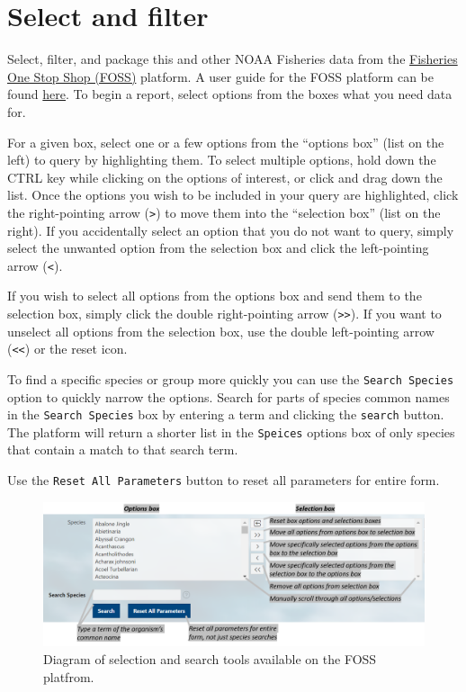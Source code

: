 \documentclass[
  letterpaper,
  oneside,
  open=any]{scrbook}
\begin{document}
\hypertarget{select-and-filter}{%
\section{Select and filter}\label{select-and-filter}}

Select, filter, and package this and other NOAA Fisheries data from the
\href{https://www.fisheries.noaa.gov/foss}{Fisheries One Stop Shop
(FOSS)} platform. A user guide for the FOSS platform can be found
\href{https://www.fisheries.noaa.gov/foss/f?p=215:7:7542600605674:::::}{here}.
To begin a report, select options from the boxes what you need data for.

For a given box, select one or a few options from the ``options box''
(list on the left) to query by highlighting them. To select multiple
options, hold down the CTRL key while clicking on the options of
interest, or click and drag down the list. Once the options you wish to
be included in your query are highlighted, click the right-pointing
arrow (\texttt{\textgreater{}}) to move them into the ``selection box''
(list on the right). If you accidentally select an option that you do
not want to query, simply select the unwanted option from the selection
box and click the left-pointing arrow (\texttt{\textless{}}).

If you wish to select all options from the options box and send them to
the selection box, simply click the double right-pointing arrow
(\texttt{\textgreater{}\textgreater{}}). If you want to unselect all
options from the selection box, use the double left-pointing arrow
(\texttt{\textless{}\textless{}}) or the reset icon.

To find a specific species or group more quickly you can use the
\texttt{Search\ Species} option to quickly narrow the options. Search
for parts of species common names in the \texttt{Search\ Species} box by
entering a term and clicking the \texttt{search} button. The platform
will return a shorter list in the \texttt{Speices} options box of only
species that contain a match to that search term.

Use the \texttt{Reset\ All\ Parameters} button to reset all parameters
for entire form.

\begin{figure}

{\centering \includegraphics[width=6.67in,height=\textheight]{content/../img/foss_2_select.png}

}

\caption{Diagram of selection and search tools available on the FOSS
platfrom.}

\end{figure}
\end{document}
